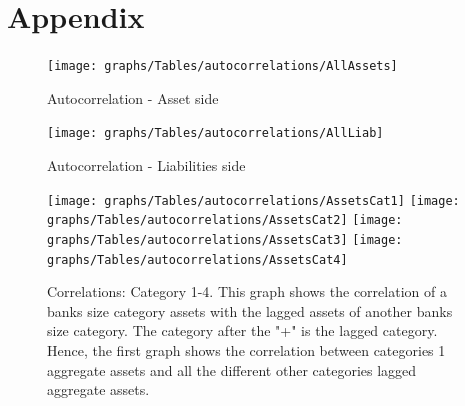 \documentclass[12pt, a4paper]{article} %
\begin{document}

\newpage
\printbibliography[
heading=bibintoc,
title={Bibliography}
]

\newpage




\appendix
\section{Appendix}

\begin{figure}[hbtp]
\begin{minipage}{\textwidth}

\centering
\texttt{[image: graphs/Tables/autocorrelations/AllAssets]}
\caption[1]{Autocorrelation - Asset side }
\label{fig:autocorrelation_asset_side}

\end{minipage}
\end{figure}

\begin{figure}[hbtp]
\begin{minipage}{\textwidth}

\centering
\texttt{[image: graphs/Tables/autocorrelations/AllLiab]}
\caption[1]{Autocorrelation - Liabilities side}
\label{fig:autocorrelation_liab_side}

\end{minipage}
\end{figure}




\begin{figure}[hbtp]
\begin{minipage}{\textwidth}
\centering
\texttt{[image: graphs/Tables/autocorrelations/AssetsCat1]}
\texttt{[image: graphs/Tables/autocorrelations/AssetsCat2]}
\texttt{[image: graphs/Tables/autocorrelations/AssetsCat3]}
\texttt{[image: graphs/Tables/autocorrelations/AssetsCat4]}
\caption[1]{Correlations: Category 1-4. This graph shows the correlation of a banks size category assets with the lagged assets of another banks size category. The category after the "+" is the lagged category. Hence, the first graph shows the correlation between categories 1 aggregate assets and all the different other categories lagged aggregate assets.}
\label{autocorrelationsCat14}
\end{minipage}
\end{figure}
\end{document}
